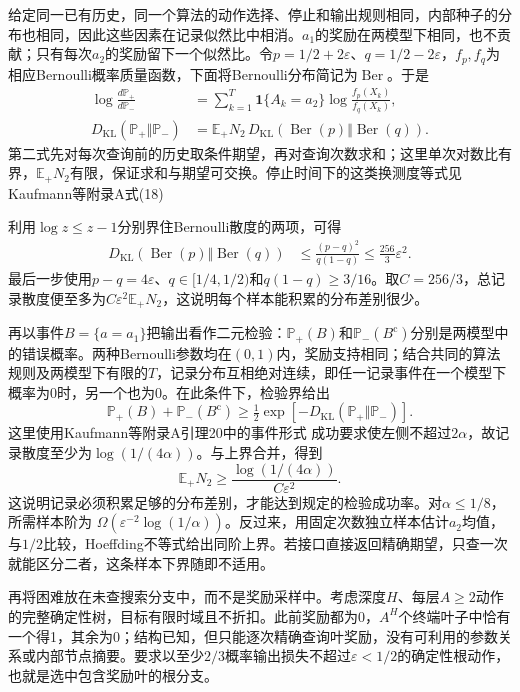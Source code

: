给定同一已有历史，同一个算法的动作选择、停止和输出规则相同，内部种子的分布也相同，因此这些因素在记录似然比中相消。$a_1$的奖励在两模型下相同，也不贡献；只有每次$a_2$的奖励留下一个似然比。令$p=1/2+2\varepsilon$、$q=1/2-2\varepsilon$，$f_p,f_q$为相应Bernoulli概率质量函数，下面将Bernoulli分布简记为$\operatorname{Ber}$。于是
\[
 \begin{aligned}
 \log\frac{d\mathbb P_+}{d\mathbb P_-}
 &=\sum_{k=1}^{T}\mathbf1\{A_k=a_2\}
          \log\frac{f_p(X_k)}{f_q(X_k)},\\
 D_{\mathrm{KL}}(\mathbb P_+\Vert\mathbb P_-)
 &=\mathbb E_+N_2\,
       D_{\mathrm{KL}}(\operatorname{Ber}(p)\Vert\operatorname{Ber}(q)).
 \end{aligned}
\]
第二式先对每次查询前的历史取条件期望，再对查询次数求和；这里单次对数比有界，$\mathbb E_+N_2$有限，保证求和与期望可交换。停止时间下的这类换测度等式见Kaufmann等附录A式(18)

利用$\log z\leq z-1$分别界住Bernoulli散度的两项，可得
\[
 \begin{aligned}
 D_{\mathrm{KL}}(\operatorname{Ber}(p)\Vert\operatorname{Ber}(q))
 &\leq\frac{(p-q)^2}{q(1-q)}
 \leq\frac{256}{3}\varepsilon^2.
 \end{aligned}
\]
最后一步使用$p-q=4\varepsilon$、$q\in[1/4,1/2)$和$q(1-q)\geq3/16$。取$C=256/3$，总记录散度便至多为$C\varepsilon^2\mathbb E_+N_2$，这说明每个样本能积累的分布差别很少。

再以事件$B=\{\widehat a=a_1\}$把输出看作二元检验：$\mathbb P_+(B)$和$\mathbb P_-(B^{\mathrm c})$分别是两模型中的错误概率。两种Bernoulli参数均在$(0,1)$内，奖励支持相同；结合共同的算法规则及两模型下有限的$T$，记录分布互相绝对连续，即任一记录事件在一个模型下概率为0时，另一个也为0。在此条件下，检验界给出
\[
 \mathbb P_+(B)+\mathbb P_-(B^{\mathrm c})
 \geq\tfrac12\exp[-D_{\mathrm{KL}}(\mathbb P_+\Vert\mathbb P_-)].
\]
这里使用Kaufmann等附录A引理20中的事件形式
成功要求使左侧不超过$2\alpha$，故记录散度至少为$\log(1/(4\alpha))$。与上界合并，得到
\[
 \mathbb E_+N_2\geq
 \frac{\log(1/(4\alpha))}{C\varepsilon^2}.
\]
这说明记录必须积累足够的分布差别，才能达到规定的检验成功率。对$\alpha\leq1/8$，所需样本阶为
$\Omega(\varepsilon^{-2}\log(1/\alpha))$。反过来，用固定次数独立样本估计$a_2$均值，与$1/2$比较，Hoeffding不等式给出同阶上界。若接口直接返回精确期望，只查一次就能区分二者，这条样本下界随即不适用。

再将困难放在未查搜索分支中，而不是奖励采样中。考虑深度$H$、每层$A\geq2$动作的完整确定性树，目标有限时域且不折扣。此前奖励都为0，$A^H$个终端叶子中恰有一个得1，其余为0；结构已知，但只能逐次精确查询叶奖励，没有可利用的参数关系或内部节点摘要。要求以至少$2/3$概率输出损失不超过$\varepsilon<1/2$的确定性根动作，也就是选中包含奖励叶的根分支。

